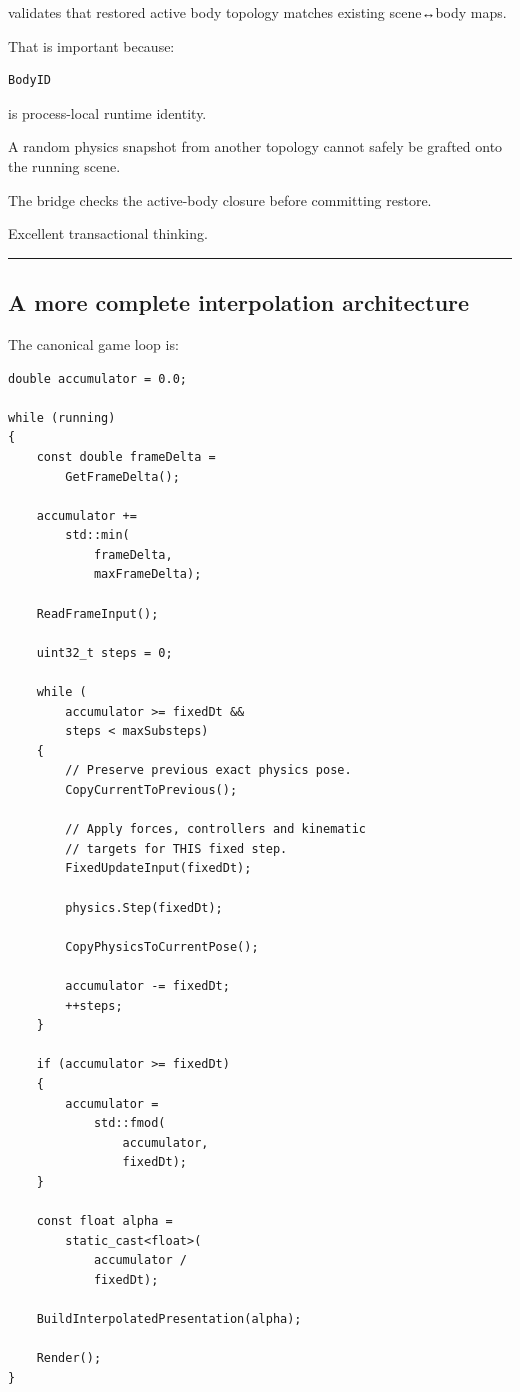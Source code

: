 \hypertarget{06-engine-ii-ch038-snapshot-topology-and-runtime-identity}{}

 validates that restored active body topology matches existing scene↔body maps.

That is important because:

\begin{verbatim}
BodyID
\end{verbatim}

is process-local runtime identity.

A random physics snapshot from another topology cannot safely be grafted onto the running scene.

The bridge checks the active-body closure before committing restore.

Excellent transactional thinking.

\begin{center}\rule{0.5\linewidth}{0.5pt}\end{center}

\subsection{A more complete interpolation architecture}\label{06-engine-ii-ch038-a-more-complete-interpolation-architecture}

\hypertarget{06-engine-ii-ch038-a-more-complete-interpolation-architecture}{}

The canonical game loop is:

\begin{verbatim}
double accumulator = 0.0;

while (running)
{
    const double frameDelta =
        GetFrameDelta();

    accumulator +=
        std::min(
            frameDelta,
            maxFrameDelta);

    ReadFrameInput();

    uint32_t steps = 0;

    while (
        accumulator >= fixedDt &&
        steps < maxSubsteps)
    {
        // Preserve previous exact physics pose.
        CopyCurrentToPrevious();

        // Apply forces, controllers and kinematic
        // targets for THIS fixed step.
        FixedUpdateInput(fixedDt);

        physics.Step(fixedDt);

        CopyPhysicsToCurrentPose();

        accumulator -= fixedDt;
        ++steps;
    }

    if (accumulator >= fixedDt)
    {
        accumulator =
            std::fmod(
                accumulator,
                fixedDt);
    }

    const float alpha =
        static_cast<float>(
            accumulator /
            fixedDt);

    BuildInterpolatedPresentation(alpha);

    Render();
}
\end{verbatim}

